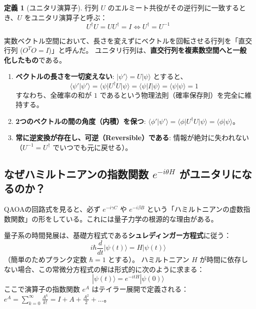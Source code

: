 \documentclass[11pt,a4paper]{ltjsarticle}
\theoremstyle{definition}
\newtheorem{definition}{定義}[section]
\theoremstyle{plain}
\theoremstyle{remark}
\newcommand{\ket}[1]{|#1\rangle}
\newcommand{\bra}[1]{\langle#1|}
\newcommand{\braket}[2]{\langle#1|#2\rangle}
\begin{document}
\begin{definition}[ユニタリ演算子]
行列 $U$ のエルミート共役がその逆行列に一致するとき、$U$ をユニタリ演算子と呼ぶ：
\begin{equation}
U^\dagger U = U U^\dagger = I \iff U^\dagger = U^{-1}
\end{equation}
\end{definition}

\begin{conceptbox}
実数ベクトル空間において、長さを変えずにベクトルを回転させる行列を「直交行列 ($O^T O = I$)」と呼んだ。
ユニタリ行列は、\textbf{直交行列を複素数空間へと一般化したもの}である。
\begin{enumerate}
    \item \textbf{ベクトルの長さを一切変えない}:
    $\ket{\psi'} = U \ket{\psi}$ とすると、
    \begin{equation}
    \braket{\psi'}{\psi'} = \bra{\psi} U^\dagger U \ket{\psi} = \bra{\psi} I \ket{\psi} = \braket{\psi}{\psi} = 1
    \end{equation}
    すなわち、全確率の和が $1$ であるという物理法則（確率保存則）を完全に維持する。
    \item \textbf{2つのベクトルの間の角度（内積）を保つ}:
    $\braket{\phi'}{\psi'} = \bra{\phi} U^\dagger U \ket{\psi} = \braket{\phi}{\psi}$。
    \item \textbf{常に逆変換が存在し、可逆（Reversible）である}:
    情報が絶対に失われない（$U^{-1} = U^\dagger$ でいつでも元に戻せる）。
\end{enumerate}
\end{conceptbox}

\subsection{なぜハミルトニアンの指数関数 $e^{-i \theta H}$ がユニタリになるのか？}
QAOAの回路式を見ると、必ず $e^{-i \gamma C}$ や $e^{-i \beta B}$ という「ハミルトニアンの虚数指数関数」の形をしている。これには量子力学の根源的な理由がある。

量子系の時間発展は、基礎方程式である\textbf{シュレディンガー方程式}に従う：
\begin{equation}
i \hbar \frac{d}{dt} \ket{\psi(t)} = H \ket{\psi(t)}
\end{equation}
（簡単のためプランク定数 $\hbar = 1$ とする）。
ハミルトニアン $H$ が時間に依存しない場合、この常微分方程式の解は形式的に次のように求まる：
\begin{equation}
\ket{\psi(t)} = e^{-i t H} \ket{\psi(0)}
\end{equation}
ここで演算子の指数関数 $e^{A}$ はテイラー展開で定義される：$e^A = \sum_{k=0}^\infty \frac{A^k}{k!} = I + A + \frac{A^2}{2} + \dots$。
\end{document}
